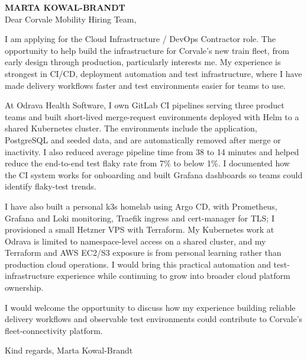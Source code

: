 \documentclass[11pt,a4paper]{article}
\begin{document}
{\Large\bfseries\color{sectioncolor} MARTA KOWAL-BRANDT}\\[0.6em]

Dear Corvale Mobility Hiring Team,

I am applying for the Cloud Infrastructure / DevOps Contractor role. The opportunity to help build the infrastructure for Corvale's new train fleet, from early design through production, particularly interests me. My experience is strongest in CI/CD, deployment automation and test infrastructure, where I have made delivery workflows faster and test environments easier for teams to use.

At Odrava Health Software, I own GitLab CI pipelines serving three product teams and built short-lived merge-request environments deployed with Helm to a shared Kubernetes cluster. The environments include the application, PostgreSQL and seeded data, and are automatically removed after merge or inactivity. I also reduced average pipeline time from 38 to 14 minutes and helped reduce the end-to-end test flaky rate from 7\% to below 1\%. I documented how the CI system works for onboarding and built Grafana dashboards so teams could identify flaky-test trends.

I have also built a personal k3s homelab using Argo CD, with Prometheus, Grafana and Loki monitoring, Traefik ingress and cert-manager for TLS; I provisioned a small Hetzner VPS with Terraform. My Kubernetes work at Odrava is limited to namespace-level access on a shared cluster, and my Terraform and AWS EC2/S3 exposure is from personal learning rather than production cloud operations. I would bring this practical automation and test-infrastructure experience while continuing to grow into broader cloud platform ownership.

I would welcome the opportunity to discuss how my experience building reliable delivery workflows and observable test environments could contribute to Corvale's fleet-connectivity platform.

Kind regards,
Marta Kowal-Brandt
\end{document}
